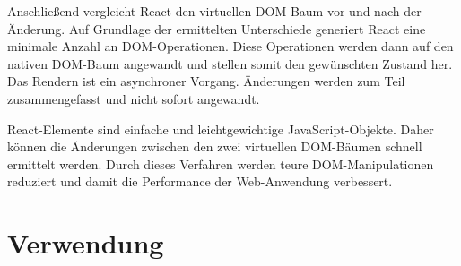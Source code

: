 Anschließend vergleicht React den virtuellen DOM-Baum vor und nach der Änderung. Auf Grundlage der ermittelten Unterschiede generiert React eine minimale Anzahl an DOM-Operationen.  Diese Operationen werden dann auf den nativen DOM-Baum angewandt und stellen somit den gewünschten Zustand her. Das Rendern ist ein asynchroner Vorgang. Änderungen werden zum Teil zusammengefasst und nicht sofort angewandt.

React-Elemente sind einfache und leichtgewichtige JavaScript-Objekte. Daher können die Änderungen zwischen den zwei virtuellen DOM-Bäumen schnell ermittelt werden. Durch dieses Verfahren werden teure DOM-Manipulationen reduziert und damit die Performance der Web-Anwendung verbessert.\autocites[vgl.][23\psq,60\psq,90\psq]{Zeigermann.2016}[vgl.][53\psq]{Stefanov.2017}[vgl.][]{Facebook.2018}
\section{Verwendung}


